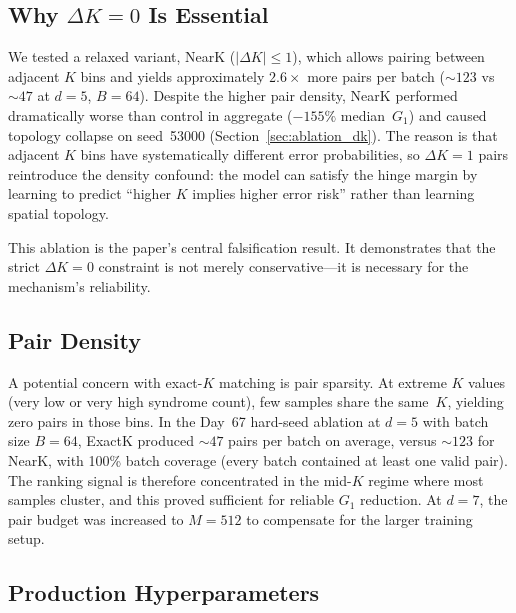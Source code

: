 \subsection{Why $\Delta K = 0$ Is Essential}

We tested a relaxed variant, NearK ($|\Delta K| \leq 1$), which allows pairing between adjacent $K$ bins and yields approximately $2.6{\times}$ more pairs per batch (${\sim}123$ vs ${\sim}47$ at $d{=}5$, $B{=}64$). Despite the higher pair density, NearK performed dramatically worse than control in aggregate ($-155\%$ median~$G_1$) and caused topology collapse on seed~53000 (Section~\ref{sec:ablation_dk}). The reason is that adjacent $K$ bins have systematically different error probabilities, so $\Delta K{=}1$ pairs reintroduce the density confound: the model can satisfy the hinge margin by learning to predict ``higher $K$ implies higher error risk'' rather than learning spatial topology.

This ablation is the paper's central falsification result. It demonstrates that the strict $\Delta K{=}0$ constraint is not merely conservative---it is necessary for the mechanism's reliability.

\subsection{Pair Density}

A potential concern with exact-$K$ matching is pair sparsity. At extreme $K$ values (very low or very high syndrome count), few samples share the same~$K$, yielding zero pairs in those bins. In the Day~67 hard-seed ablation at $d{=}5$ with batch size $B{=}64$, ExactK produced ${\sim}47$ pairs per batch on average, versus ${\sim}123$ for NearK, with 100\% batch coverage (every batch contained at least one valid pair). The ranking signal is therefore concentrated in the mid-$K$ regime where most samples cluster, and this proved sufficient for reliable $G_1$ reduction. At $d{=}7$, the pair budget was increased to $M{=}512$ to compensate for the larger training setup.

\subsection{Production Hyperparameters}

